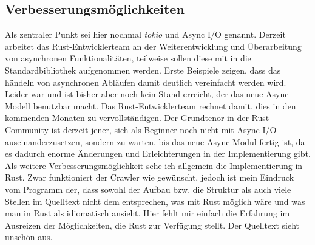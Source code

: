 \subsection{Verbesserungsmöglichkeiten}
Als zentraler Punkt sei hier nochmal \emph{tokio} und Async I/O genannt.
Derzeit arbeitet das Rust-Entwicklerteam an der Weiterentwicklung und
Überarbeitung von asynchronen Funktionalitäten, teilweise sollen diese mit in
die Standardbibliothek aufgenommen werden. Erste Beispiele zeigen, dass das
händeln von asynchronen Abläufen damit deutlich vereinfacht werden wird.
Leider war und ist bisher aber noch kein Stand erreicht, der das neue
Async-Modell benutzbar macht. Das Rust-Entwicklerteam rechnet damit, dies in
den kommenden Monaten zu vervollständigen. Der Grundtenor in der
Rust-Community ist derzeit jener, sich als Beginner noch nicht mit Async I/O
auseinanderzusetzen, sondern zu warten, bis das neue Async-Modul fertig ist,
da es dadurch enorme Änderungen und Erleichterungen in der Implementierung
gibt.\\
Als weitere Verbesserungsmöglichkeit sehe ich allgemein die Implementierung
in Rust. Zwar funktioniert der Crawler wie gewünscht, jedoch ist mein
Eindruck vom Programm der, dass sowohl der Aufbau bzw. die Struktur als auch
viele Stellen im Quelltext nicht dem entsprechen, was mit Rust möglich wäre
und was man in Rust als idiomatisch ansieht. Hier fehlt mir einfach die
Erfahrung im Ausreizen der Möglichkeiten, die Rust zur Verfügung stellt. Der
Quelltext sieht unschön aus.